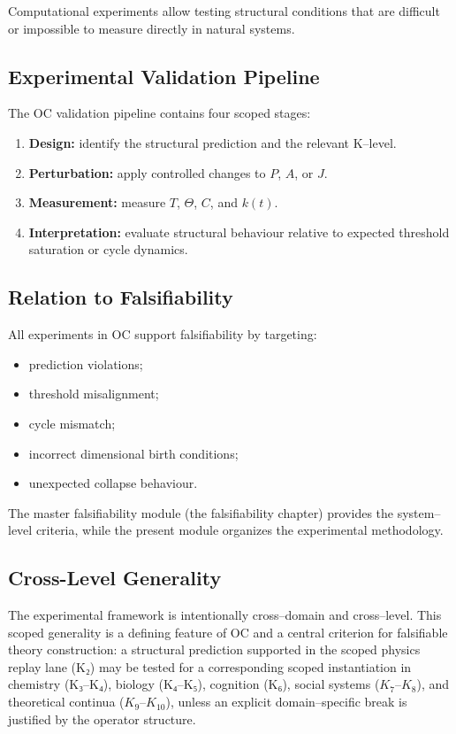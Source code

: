 Computational experiments allow testing structural conditions that are
difficult or impossible to measure directly in natural systems.


\subsection{Experimental Validation Pipeline}

The OC validation pipeline contains four scoped stages:

\begin{enumerate}
    \item \textbf{Design:} identify the structural prediction and the relevant
          K–level.
    \item \textbf{Perturbation:} apply controlled changes to $P$, $A$, or $J$.
    \item \textbf{Measurement:} measure $T$, $\Theta$, $C$, and $k(t)$.
    \item \textbf{Interpretation:} evaluate structural behaviour relative to
          expected threshold saturation or cycle dynamics.
\end{enumerate}


\subsection{Relation to Falsifiability}

All experiments in OC support falsifiability by targeting:

\begin{itemize}
    \item prediction violations;
    \item threshold misalignment;
    \item cycle mismatch;
    \item incorrect dimensional birth conditions;
    \item unexpected collapse behaviour.
\end{itemize}

The master falsifiability module (the falsifiability chapter)
provides the system–level criteria, while the present module organizes the
experimental methodology.


\subsection{Cross-Level Generality}

The experimental framework is intentionally cross–domain and cross–level.
This scoped generality is a defining feature of OC and a central criterion for
falsifiable theory construction:  
a structural prediction supported in the scoped physics replay lane (K₂) may be tested for a corresponding scoped instantiation in chemistry (K₃–K₄), biology (K₄–K₅), cognition (K₆), social
systems ($K_7$–$K_8$), and theoretical continua ($K_9$–$K_{10}$), unless an explicit
domain–specific break is justified by the operator structure.


